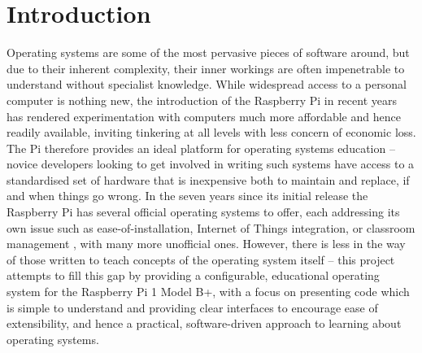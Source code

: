 \section{Introduction}
    Operating systems are some of the most pervasive pieces of software around,
    but due to their inherent complexity, their inner workings are often
    impenetrable to understand without specialist knowledge. While widespread
    access to a personal computer is nothing new, the introduction of the
    Raspberry Pi in recent years has rendered experimentation with computers
    much more affordable and hence readily available, inviting tinkering at all
    levels with less concern of economic loss. The Pi therefore provides an
    ideal platform for operating systems education -- novice developers looking
    to get involved in writing such systems have access to a standardised set of
    hardware that is inexpensive both to maintain and replace, if and when
    things go wrong. In the seven years since its initial release the Raspberry
    Pi has several official operating systems to offer, each addressing its own
    issue such as ease-of-installation, Internet of Things integration, or
    classroom management \cite{OSes}, with many more unofficial ones. However,
    there is less in the way of those written to teach concepts of the operating
    system itself -- this project attempts to fill this gap by providing a
    configurable, educational operating system for the Raspberry Pi 1 Model B+,
    with a focus on presenting code which is simple to understand and providing
    clear interfaces to encourage ease of extensibility, and hence a practical,
    software-driven approach to learning about operating systems.
